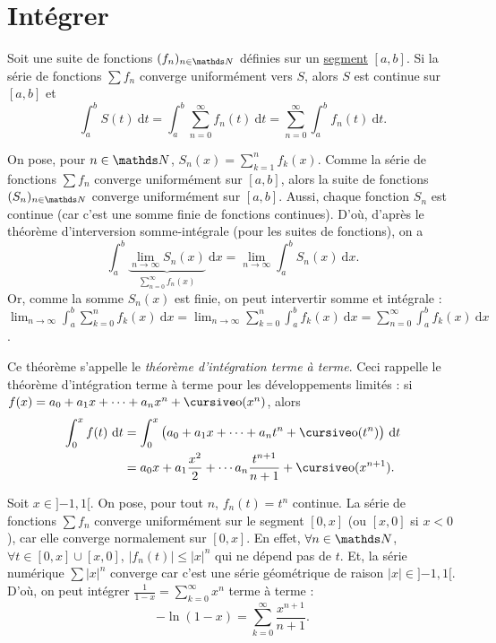 \section{Intégrer}

\begin{thm}
	Soit une suite de fonctions $(f_n)_{n\in\N}$\/ définies sur un \underline{segment} $[a,b]$. Si la série de fonctions $\sum f_n$\/ converge uniformément vers $S$, alors $S$\/ est continue sur $[a,b]$\/ et \[
		\int_{a}^{b} S(t)~\mathrm{d}t = \int_{a}^{b} \sum_{n=0}^\infty f_n(t)~\mathrm{d}t = \sum_{n=0}^\infty \int_{a}^{b} f_n(t)~\mathrm{d}t
	.\]
\end{thm}

\begin{prv}
	On pose, pour $n \in \N$, $S_n(x) = \sum_{k=1}^n f_k(x)$. Comme la série de fonctions $\sum f_n$\/ converge uniformément sur $[a,b]$, alors la suite de fonctions $(S_n)_{n\in\N}$\/ converge uniformément sur $[a,b]$. Aussi, chaque fonction $S_n$\/ est continue (car c'est une somme finie de fonctions continues). D'où, d'après le théorème d'interversion somme-intégrale (pour les suites de fonctions), on a \[
		\int_{a}^{b} \underbrace{\lim_{n\to \infty} S_n(x)}_{\sum_{n=0}^\infty f_n(x)} ~\mathrm{d}x = \lim_{n\to \infty} \int_{a}^{b} S_n(x) ~\mathrm{d}x
	.\] Or, comme la somme $S_n(x)$\/ est finie, on peut intervertir somme et intégrale : $\lim_{n\to \infty} \int_{a}^{b} \sum_{k=0}^n f_k(x)~\mathrm{d}x = \lim_{n\to \infty} \sum_{k=0}^n \int_{a}^{b} f_k(x)~\mathrm{d}x = \sum_{n=0}^\infty \int_{a}^{b} f_k(x)~\mathrm{d}x$.
\end{prv}

Ce théorème s'appelle le \textsl{théorème d'intégration terme à terme}. Ceci rappelle le théorème d'intégration terme à terme pour les développements limités : si $f(x) = a_0 + a_1 x + \cdots + a_n x^n + \po(x^n)$, alors
\begin{align*}
	\int_{0}^{x} f(t)~\mathrm{d}t &= \int_{0}^{x} \big(a_0 + a_1x + \cdots + a_n t^n + \po(t^n)\big)~\mathrm{d}t\\
	&= a_0 x + a_1 \frac{x^2}{2} + \cdots a_n \frac{t^{n+1}}{n+1} + \po(x^{n+1}).
\end{align*}

\begin{exo}
	Soit $x \in {]{-1},1[}$. On pose, pour tout $n$, $f_n(t) = t^n$\/ continue. La série de fonctions $\sum f_n$\/ converge uniformément sur le segment $[0, x]$ (ou $[x, 0]$ si $x < 0$), car elle converge normalement sur $[0,x]$. En effet, $\forall n \in \N$, $\forall t \in [0,x] \cup [x,0]$, $|f_n(t)| \le |x|^n$\/ qui ne dépend pas de $t$. Et, la série numérique $\sum |x|^n$\/ converge car c'est une série géométrique de raison $|x| \in {]{-1},1[}$. D'où, on peut intégrer $\frac{1}{1-x} = \sum_{k=0}^{\infty} x^n$\/ terme à terme : \[
		-\ln(1-x) = \sum_{k=0}^\infty \frac{x^{n+1}}{n+1}
	.\]
\end{exo}

